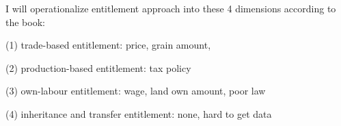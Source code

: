 I will operationalize entitlement approach into these 4 dimensions according to the book:

(1) trade-based entitlement: price, grain amount, 

(2) production-based entitlement: tax policy

(3) own-labour entitlement: wage, land own amount, poor law

(4) inheritance and transfer entitlement: none, hard to get data






